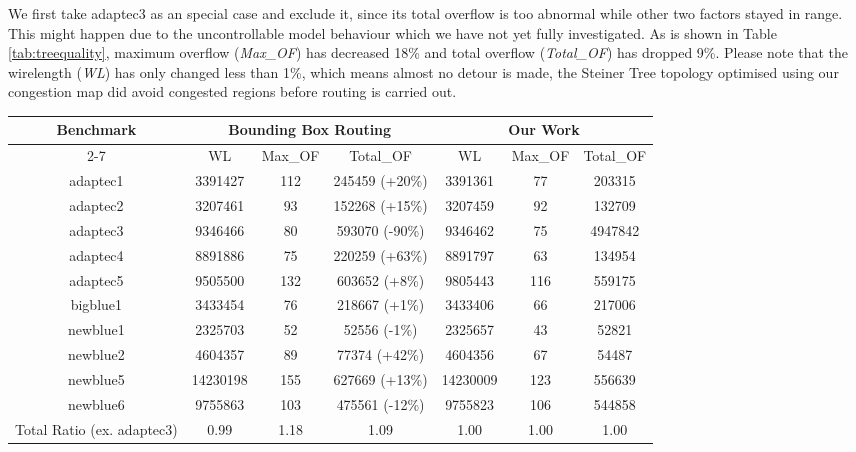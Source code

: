 We first take adaptec3 as an special case and exclude it, since its total overflow is too abnormal while other two factors stayed in range. This might happen due to the uncontrollable model behaviour which we have not yet fully investigated. As is shown in Table \ref{tab:treequality}, maximum overflow (\textit{Max\_OF}) has decreased 18\% and total overflow (\textit{Total\_OF}) has dropped 9\%. Please note that the wirelength (\textit{WL}) has only changed less than 1\%, which means almost no detour is made, the Steiner Tree topology optimised using our congestion map did avoid congested regions before routing is carried out.



\begin{table*}[htbp]
\caption{Result of Steiner Tree quality after edge shifting}
\begin{center}
\begin{tabular}{|c|c|c|c|c|c|c|}
\hline
\multirow{2}{*}{Benchmark} & \multicolumn{3}{c|}{Bounding Box Routing}     & \multicolumn{3}{c|}{Our Work}  \\ \cline{2-7} 
                           & WL       & Max\_OF & Total\_OF      & WL       & Max\_OF & Total\_OF \\ \hline
adaptec1                   & 3391427  & 112     & 245459 (+20\%) & 3391361  & 77      & 203315    \\ \hline
adaptec2                   & 3207461  & 93      & 152268 (+15\%) & 3207459  & 92      & 132709    \\ \hline
adaptec3                   & 9346466  & 80      & 593070 (-90\%) & 9346462  & 75      & 4947842   \\ \hline
adaptec4                   & 8891886  & 75      & 220259 (+63\%) & 8891797  & 63      & 134954    \\ \hline
adaptec5                   & 9505500  & 132     & 603652 (+8\%)  & 9805443  & 116     & 559175    \\ \hline
bigblue1                   & 3433454  & 76      & 218667 (+1\%)  & 3433406  & 66      & 217006    \\ \hline
newblue1                   & 2325703  & 52      & 52556 (-1\%)   & 2325657  & 43      & 52821     \\ \hline
newblue2                   & 4604357  & 89      & 77374 (+42\%)  & 4604356  & 67      & 54487     \\ \hline
newblue5                   & 14230198 & 155     & 627669 (+13\%) & 14230009 & 123     & 556639    \\ \hline
newblue6                   & 9755863  & 103     & 475561 (-12\%) & 9755823  & 106     & 544858    \\ \hline
Total Ratio (ex. adaptec3)       & 0.99     & 1.18    & 1.09           & 1.00        & 1.00       & 1.00         \\ \hline
\end{tabular}
\label{tab:treequality}
\end{center}
\end{table*}

